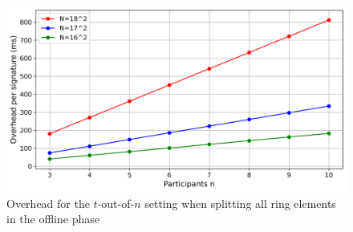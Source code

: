 \begin{figure}[t]
    \centering
    \includegraphics[scale=0.49]{images/plots/overheadToutofN.png}
    \caption{Overhead for the $t$-out-of-$n$ setting when splitting all ring elements in the offline phase}
    \label{fig:overheadToutofN}
\end{figure}


